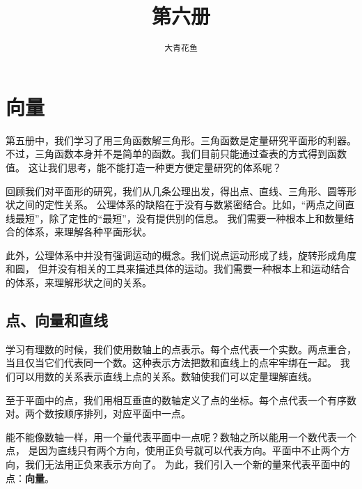 \documentclass[12pt,UTF8]{ctexbook}
\title{\zihao{0} \bfseries 第六册}
\author{\zihao{2} \texttt{大青花鱼}}
\date{}
\begin{document}
\maketitle
\tableofcontents
\newpage

\chapter{向量}
第五册中，我们学习了用三角函数解三角形。三角函数是定量研究平面形的利器。
不过，三角函数本身并不是简单的函数。我们目前只能通过查表的方式得到函数值。
这让我们思考，能不能打造一种更方便定量研究的体系呢？

回顾我们对平面形的研究，我们从几条公理出发，得出点、直线、三角形、圆等形状之间的定性关系。
公理体系的缺陷在于没有与数紧密结合。比如，“两点之间直线最短”，除了定性的“最短”，没有提供别的信息。
我们需要一种根本上和数量结合的体系，来理解各种平面形状。

此外，公理体系中并没有强调运动的概念。我们说点运动形成了线，旋转形成角度和圆，
但并没有相关的工具来描述具体的运动。我们需要一种根本上和运动结合的体系，来理解形状之间的关系。

\section{点、向量和直线}
学习有理数的时候，我们使用数轴上的点表示。每个点代表一个实数。两点重合，
当且仅当它们代表同一个数。这种表示方法把数和直线上的点牢牢绑在一起。
我们可以用数的关系表示直线上点的关系。数轴使我们可以定量理解直线。

至于平面中的点，我们用相互垂直的数轴定义了点的坐标。每个点代表一个有序数对。两个数按顺序排列，对应平面中一点。

能不能像数轴一样，用一个量代表平面中一点呢？数轴之所以能用一个数代表一个点，
是因为直线只有两个方向，使用正负号就可以代表方向。平面中不止两个方向，我们无法用正负来表示方向了。
为此，我们引入一个新的量来代表平面中的点：\textbf{向量}。
\end{document}
